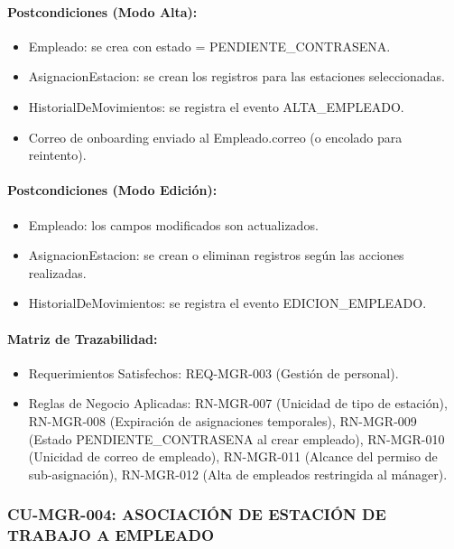 \paragraph{Postcondiciones (Modo Alta):}
\begin{itemize}
    \item Empleado: se crea con estado = PENDIENTE\_CONTRASENA.
    \item AsignacionEstacion: se crean los registros para las estaciones seleccionadas.
    \item HistorialDeMovimientos: se registra el evento ALTA\_EMPLEADO.
    \item Correo de onboarding enviado al Empleado.correo (o encolado para reintento).
\end{itemize}

\paragraph{Postcondiciones (Modo Edición):}
\begin{itemize}
    \item Empleado: los campos modificados son actualizados.
    \item AsignacionEstacion: se crean o eliminan registros según las acciones realizadas.
    \item HistorialDeMovimientos: se registra el evento EDICION\_EMPLEADO.
\end{itemize}

\paragraph{Matriz de Trazabilidad:}
\begin{itemize}
    \item Requerimientos Satisfechos: REQ-MGR-003 (Gestión de personal).
    \item Reglas de Negocio Aplicadas: RN-MGR-007 (Unicidad de tipo de estación), RN-MGR-008 (Expiración de asignaciones temporales), RN-MGR-009 (Estado PENDIENTE\_CONTRASENA al crear empleado), RN-MGR-010 (Unicidad de correo de empleado), RN-MGR-011 (Alcance del permiso de sub-asignación), RN-MGR-012 (Alta de empleados restringida al mánager).
\end{itemize}

\subsubsection{CU-MGR-004: ASOCIACIÓN DE ESTACIÓN DE TRABAJO A EMPLEADO}
